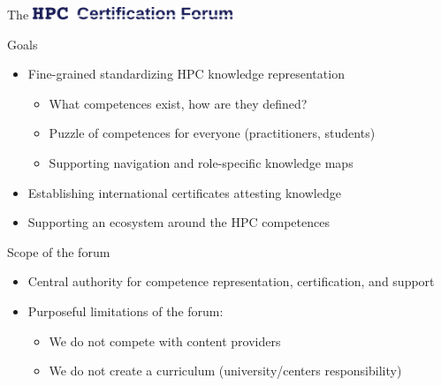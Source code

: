 \documentclass[compress,aspectratio=169]{beamer}
\begin{document}
\begin{frame}{The \includegraphics[width=0.45\textwidth]{hpccf-full}}
		\begin{block}{Goals}
			\begin{itemize}
				\item Fine-grained standardizing HPC knowledge representation
          \begin{itemize}
            \item What competences exist, how are they defined?
            \item Puzzle of competences for everyone (practitioners, students)
            \item Supporting navigation and role-specific knowledge maps
          \end{itemize}
				\item Establishing international certificates attesting knowledge
        \item Supporting an ecosystem around the HPC competences
			\end{itemize}
		\end{block}

    \begin{block}{Scope of the forum}
    \begin{itemize}
      \item Central authority for competence representation, certification, and support
      \item Purposeful limitations of the forum:
			\begin{itemize}
				\item We do not compete with content providers
				\item We do not create a curriculum (university/centers responsibility)
			\end{itemize}
    \end{itemize}
		\end{block}
\end{frame}
\end{document}
